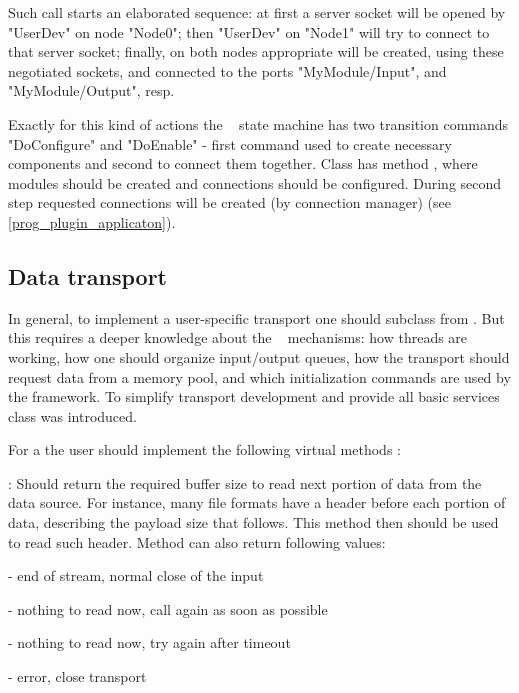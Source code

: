 Such call starts an elaborated sequence: at first a server socket will be opened 
by  "UserDev" on node "Node0";
then  "UserDev" on "Node1" will try to connect to that server socket;
finally, on both nodes appropriate  
will be created, using these negotiated sockets,
and connected to the ports "MyModule/Input", and  "MyModule/Output", resp.

Exactly for this kind of actions the \dabc~ state machine has 
two transition commands "DoConfigure" and "DoEnable" - first command used to
create necessary components and second to connect them together. 
Class  has method , where
modules should be created and connections should be configured. During second step
requested connections will be created (by connection manager)
 (see \ref{prog_plugin_applicaton}).  


\subsection{Data transport}
\label{prog_plugin_device_datatransport}
In general, to implement a user-specific transport one should subclass from
. But this requires a deeper knowledge 
about the \dabc~ mechanisms:
how threads are working,
how one should organize input/output queues, how the transport should request data from a
memory pool, and which initialization commands are used by the framework. 
To simplify transport development and provide all basic services 
class  was introduced.  

For a  the
user should implement the  following virtual methods : 

\bbul
\item [\func{Read\_Size()}] : 
   Should return the required buffer size to read next portion of data from
   the data source. For instance, many file formats have a header before
   each portion of data, describing the payload size that follows. 
   This method then should be used to read such header. 
   Method can also return following values:
   \bdes
   \item[\keyw{dabc::di\_EndOfStream}] - end of stream, normal close of the input
   \item[\keyw{dabc::di\_Repeat}]      - nothing to read now, call again as soon as possible
   \item[\keyw{dabc::di\_RepeatTimeout}] - nothing to read now, try again after timeout
   \item[\keyw{dabc::di\_Error}]         - error, close transport
   \edes

